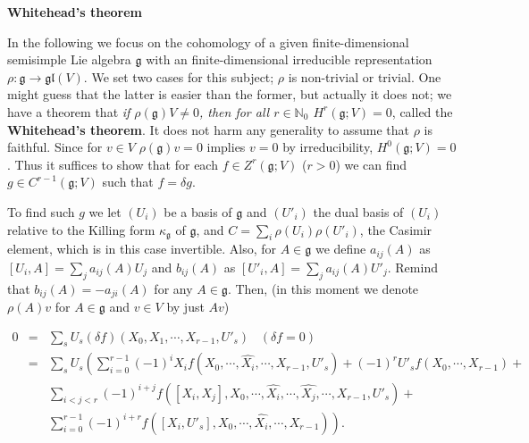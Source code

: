 \documentclass{article}
\newcommand{\NaN}{\mathbb{N}}
\newcommand{\lie}[1]{\mathfrak{#1}}
\begin{document}
\newpage

\textbf{Whitehead's theorem}

In the following we focus on the cohomology of a given finite-dimensional semisimple Lie algebra $\lie{g}$ with an finite-dimensional irreducible representation $\rho : \lie{g} \to \lie{gl}(V)$.
We set two cases for this subject; $\rho$ is non-trivial or trivial.
One might guess that the latter is easier than the former, but actually it does not; we have a theorem that \textit{if $\rho(\lie{g})V \ne 0$, then for all $r \in \NaN_0$ $H^r(\lie{g}; V) = 0$}, called the \textbf{Whitehead's theorem}.
It does not harm any generality to assume that $\rho$ is faithful.
Since for $v \in V$ $\rho(\lie{g})v = 0$ implies $v = 0$ by irreducibility, $H^0(\lie{g}; V) = 0$.
Thus it suffices to show that for each $f \in Z^r(\lie{g}; V)$ ($r > 0$) we can find $g \in C^{r - 1}(\lie{g}; V)$ such that $f = \delta g$.

To find such $g$ we let $(U_i)$ be a basis of $\lie{g}$ and $(U'_i)$ the dual basis of $(U_i)$ relative to the Killing form $\kappa_\lie{g}$ of $\lie{g}$, and $C = \sum_i \rho(U_i) \rho(U'_i)$, the Casimir element, which is in this case invertible.
Also, for $A \in \lie{g}$ we define $a_{ij}(A)$ as $[U_i, A] = \sum_j a_{ij}(A) U_j$ and $b_{ij}(A)$ as $[U'_i, A] = \sum_j a_{ij}(A) U'_j$.
Remind that $b_{ij}(A) = -a_{ji}(A)$ for any $A \in \lie{g}$.
Then, (in this moment we denote $\rho(A)v$ for $A \in \lie{g}$ and $v \in V$ by just $Av$)

{\small
\begin{eqnarray*}
  0 &=& \sum_s U_s (\delta f)(X_0, X_1, \cdots, X_{r - 1}, U'_s) \;\;\; (\delta f = 0) \\
  &=& \sum_s U_s \left( \sum_{i = 0}^{r - 1} (-1)^i X_i f(X_0, \cdots, \hat{X_i}, \cdots, X_{r - 1}, U'_s) + (-1)^r U'_s f(X_0, \cdots, X_{r - 1}) + \right. \\
  & & \left. \sum_{i < j < r} (-1)^{i + j} f([X_i, X_j], X_0, \cdots, \hat{X_i}, \cdots, \hat{X_j}, \cdots, X_{r - 1}, U'_s) + \right. \\
  & & \left. \sum_{i = 0}^{r - 1} (-1)^{i + r} f([X_i, U'_s], X_0, \cdots, \hat{X_i}, \cdots, X_{r - 1}) \right).
\end{eqnarray*}
}
\end{document}

